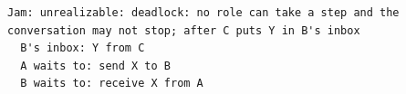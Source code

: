 \begin{lstlisting}[language={},basicstyle=\ttfamily\footnotesize,breaklines=true]
Jam: unrealizable: deadlock: no role can take a step and the conversation may not stop; after C puts Y in B's inbox
  B's inbox: Y from C
  A waits to: send X to B
  B waits to: receive X from A
\end{lstlisting}
